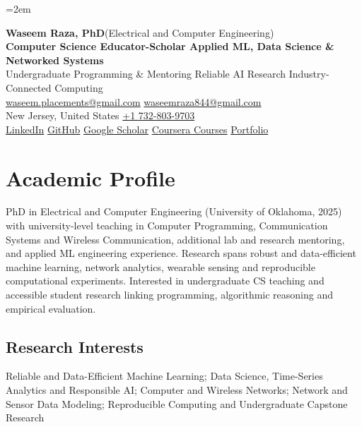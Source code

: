 \documentclass[9pt,letterpaper]{extarticle}
\begin{document}
\emergencystretch=2em
\begin{center}
{\LARGE\bfseries Waseem Raza, PhD}{\normalsize\mdseries \enspace (Electrical and Computer Engineering)}\\[2pt]
{\large\bfseries Computer Science Educator-Scholar \textbar{} Applied ML, Data Science \& Networked Systems}\\[1pt]
{\small Undergraduate Programming \& Mentoring \textbar{} Reliable AI Research \textbar{} Industry-Connected Computing}\\[3pt]
{\footnotesize {}\enspace \href{mailto:waseem.placements@gmail.com}{waseem.placements@gmail.com} \textbar{} \href{mailto:waseemraza844@gmail.com}{waseemraza844@gmail.com}\\[1pt]New Jersey, United States \quad {}\enspace \href{tel:+17328039703}{+1 732-803-9703}\\[1pt]\href{https://www.linkedin.com/in/waseem-raza-phd-9a737858/}{LinkedIn} \textbar{} \href{https://github.com/WaseemRaza844}{GitHub} \textbar{} \href{https://scholar.google.com/citations?user=d58Drr0AAAAJ\&hl=en}{Google Scholar} \textbar{} \href{https://waseemraza844.github.io/portfolio/learning.html}{Coursera Courses} \textbar{} \href{https://waseemraza844.github.io/portfolio/}{Portfolio}}
\end{center}
\vspace{-5pt}
\section{Academic Profile}
PhD in Electrical and Computer Engineering (University of Oklahoma, 2025) with university-level teaching in Computer Programming, Communication Systems and Wireless Communication, additional lab and research mentoring, and applied ML engineering experience. Research spans robust and data-efficient machine learning, network analytics, wearable sensing and reproducible computational experiments. Interested in undergraduate CS teaching and accessible student research linking programming, algorithmic reasoning and empirical evaluation.
\subsection{Research Interests}
Reliable and Data-Efficient Machine Learning; Data Science, Time-Series Analytics and Responsible AI; Computer and Wireless Networks; Network and Sensor Data Modeling; Reproducible Computing and Undergraduate Capstone Research\par
{}
\end{document}
